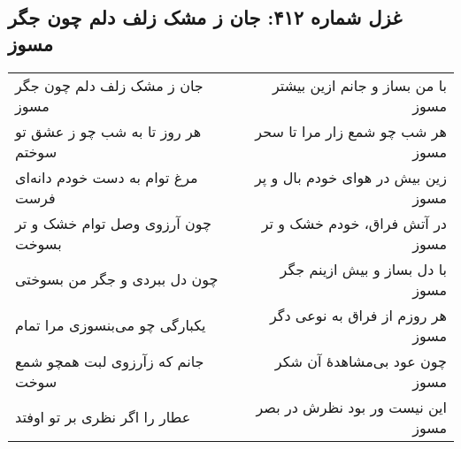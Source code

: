 \begin{center}
\section*{غزل شماره ۴۱۲: جان ز مشک زلف دلم چون جگر مسوز}
\label{sec:412}
\begin{longtable}{l p{0.5cm} r}
جان ز مشک زلف دلم چون جگر مسوز
&&
با من بساز و جانم ازین بیشتر مسوز
\\
هر روز تا به شب چو ز عشق تو سوختم
&&
هر شب چو شمع زار مرا تا سحر مسوز
\\
مرغ توام به دست خودم دانه‌ای فرست
&&
زین بیش در هوای خودم بال و پر مسوز
\\
چون آرزوی وصل توام خشک و تر بسوخت
&&
در آتش فراق، خودم خشک و تر مسوز
\\
چون دل ببردی و جگر من بسوختی
&&
با دل بساز و بیش ازینم جگر مسوز
\\
یکبارگی چو می‌بنسوزی مرا تمام
&&
هر روزم از فراق به نوعی دگر مسوز
\\
جانم که زآرزوی لبت همچو شمع سوخت
&&
چون عود بی‌مشاهدهٔ آن شکر مسوز
\\
عطار را اگر نظری بر تو اوفتد
&&
این نیست ور بود نظرش در بصر مسوز
\\
\end{longtable}
\end{center}
